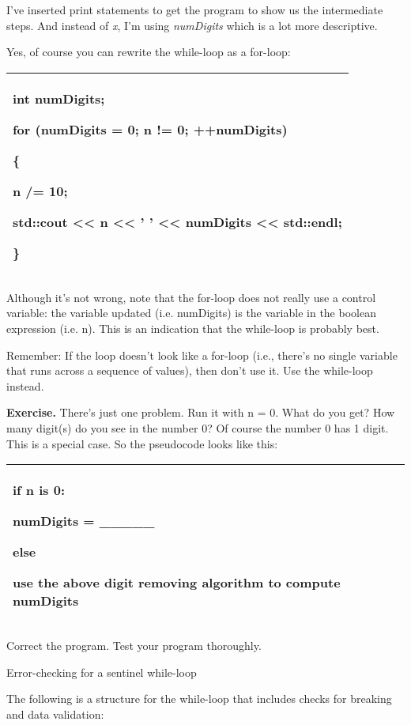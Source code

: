 \documentclass[
]{article}
\begin{document}
I've inserted print statements to get the program to show us the
intermediate steps. And instead of \emph{x}, I'm using \emph{numDigits}
which is a lot more descriptive.

Yes, of course you can rewrite the while-loop as a for-loop:

\begin{longtable}[]{@{}l@{}}
\toprule
\endhead
\begin{minipage}[t]{0.97\columnwidth}\raggedright
int numDigits;

for (numDigits = 0; n != 0; ++numDigits)

\{

n /= 10;

std::cout \textless\textless{} n \textless\textless{} ' '
\textless\textless{} numDigits \textless\textless{} std::endl;

\}\strut
\end{minipage}\tabularnewline
\bottomrule
\end{longtable}

Although it's not wrong, note that the for-loop does not really use a
control variable: the variable updated (i.e. numDigits) is the variable
in the boolean expression (i.e. n). This is an indication that the
while-loop is probably best.

Remember: If the loop doesn't look like a for-loop (i.e., there's no
single variable that runs across a sequence of values), then don't use
it. Use the while-loop instead.

\textbf{Exercise.} There's just one problem. Run it with n = 0. What do
you get? How many digit(s) do you see in the number 0? Of course the
number 0 has 1 digit. This is a special case. So the pseudocode looks
like this:

\begin{longtable}[]{@{}l@{}}
\toprule
\endhead
\begin{minipage}[t]{0.97\columnwidth}\raggedright
if n is 0:

numDigits = \_\_\_\_\_

else

use the above digit removing algorithm to compute numDigits\strut
\end{minipage}\tabularnewline
\bottomrule
\end{longtable}

Correct the program. Test your program thoroughly.

Error-checking for a sentinel while-loop

The following is a structure for the while-loop that includes checks for
breaking and data validation:
\end{document}
